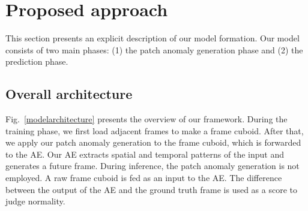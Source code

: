 \documentclass[10pt,twocolumn,letterpaper]{article}
\begin{document}
\vspace{-0.2cm}
\section{Proposed approach}
This section presents an explicit description of our model formation. Our model consists of two main phases: (1) the patch anomaly generation phase and (2) the prediction phase.
\vspace{-0.3em}
\subsection{Overall architecture}
Fig.~\ref{modelarchitecture} presents the overview of our framework. During the training phase, we first load  adjacent frames to make a frame cuboid. After that, we apply our patch anomaly generation to the frame cuboid, which is forwarded to the AE. Our AE extracts spatial and temporal patterns of the input and generates a future frame. During inference, the patch anomaly generation is not employed. A raw frame cuboid is fed as an input to the AE. The difference between the output of the AE and the ground truth frame is used as a score to judge normality.
\vspace{-0.3em}
\end{document}
